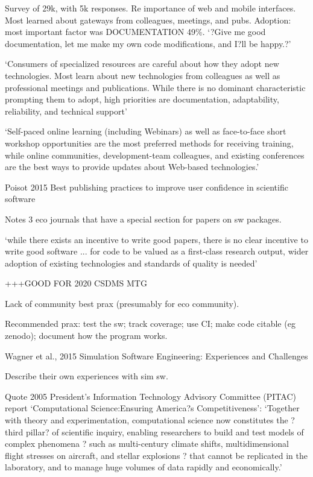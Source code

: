 \documentclass[12pt]{amsart}
\begin{document}
Survey of 29k, with 5k responses. Re importance of web and mobile interfaces. Most learned about gateways from colleagues, meetings, and pubs. Adoption: most important factor was DOCUMENTATION 49\%. `?Give me good documentation, let me make my own code modifications, and I?ll be happy.?'

`Consumers of specialized resources are careful about how they adopt new technologies. Most learn about new technologies from colleagues as well as professional meetings and publications. While there is no dominant characteristic prompting them to adopt, high priorities are documentation, adaptability, reliability, and technical support'

`Self-paced online learning (including Webinars) as well as face-to-face short workshop opportunities are the most preferred methods for receiving training, while online communities, development-team colleagues, and existing conferences are the best ways to provide updates about Web-based technologies.'


Poisot 2015 Best publishing practices to improve user confidence in scientific software

Notes 3 eco journals that have a special section for papers on sw packages.

`while there exists an incentive to write good papers, there is no clear incentive to write good software ... for code to be valued as a first-class research output, wider adoption of existing technologies and standards of quality is needed'

+++GOOD FOR 2020 CSDMS MTG

Lack of community best prax (presumably for eco community).

Recommended prax: test the sw; track coverage; use CI; make code citable (eg zenodo); document how the program works.


Wagner et al., 2015 Simulation Software Engineering: Experiences and Challenges

Describe their own experiences with sim sw.

Quote 2005 President's Information Technology Advisory Committee (PITAC) report `Computational Science:Ensuring America?s Competitiveness': `Together with theory and experimentation, computational science now constitutes the ?third pillar? of scientific inquiry, enabling researchers to build and test models of complex phenomena ? such as multi-century climate shifts, multidimensional flight stresses on aircraft, and stellar explosions ? that cannot be replicated in the laboratory, and to manage huge volumes of data rapidly and economically.'
\end{document}
